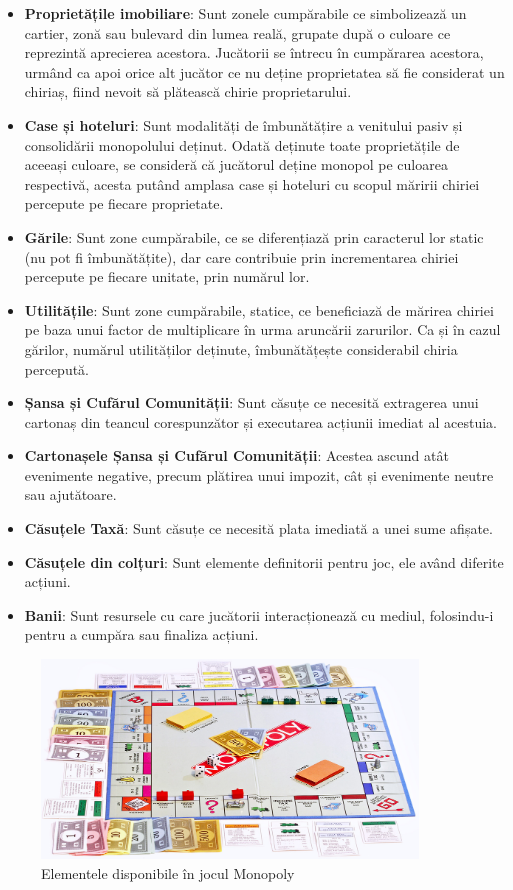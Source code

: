 \begin{itemize}
    \item \textbf{Proprietățile imobiliare}: Sunt zonele cumpărabile ce simbolizează un cartier, zonă sau bulevard din lumea reală, grupate după o culoare ce reprezintă aprecierea acestora. Jucătorii se întrecu în cumpărarea acestora, urmând ca apoi orice alt jucător ce nu deține proprietatea să fie considerat un chiriaș, fiind nevoit să plătească chirie proprietarului.
    \item \textbf{Case și hoteluri}: Sunt modalități de îmbunătățire a venitului pasiv și consolidării monopolului deținut. Odată deținute toate proprietățile de aceeași culoare, se consideră că jucătorul deține monopol pe culoarea respectivă, acesta putând amplasa case și hoteluri cu scopul măririi chiriei percepute pe fiecare proprietate.
    \item \textbf{Gările}: Sunt zone cumpărabile, ce se diferențiază prin caracterul lor static (nu pot fi îmbunătățite), dar care contribuie prin incrementarea chiriei percepute pe fiecare unitate, prin numărul lor.
    \item \textbf{Utilitățile}: Sunt zone cumpărabile, statice, ce beneficiază de mărirea chiriei pe baza unui factor de multiplicare în urma aruncării zarurilor. Ca și în cazul gărilor, numărul utilităților deținute, îmbunătățește considerabil chiria percepută.
    \item \textbf{Șansa și Cufărul Comunității}: Sunt căsuțe ce necesită extragerea unui cartonaș din teancul corespunzător și executarea acțiunii imediat al acestuia.
    \item \textbf{Cartonașele Șansa și Cufărul Comunității}: Acestea ascund atât evenimente negative, precum plătirea unui impozit, cât și evenimente neutre sau ajutătoare.
    \item \textbf{Căsuțele Taxă}: Sunt căsuțe ce necesită plata imediată a unei sume afișate.
    \item \textbf{Căsuțele din colțuri}: Sunt elemente definitorii pentru joc, ele având diferite acțiuni.
    \item \textbf{Banii}: Sunt resursele cu care jucătorii interacționează cu mediul, folosindu-i pentru a cumpăra sau finaliza acțiuni.
\end{itemize}

\begin{figure}[H]
    \centering
    \includegraphics[width=10cm]{images/monopoly_elements.jpg}
    \caption{Elementele disponibile în jocul Monopoly \cite{wikipedia_monopoly}}
    \label{fig:monopoly-elements}
\end{figure}

